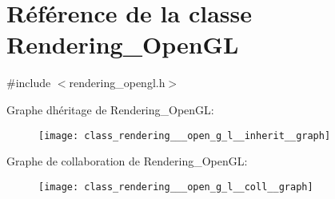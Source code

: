 \hypertarget{class_rendering___open_g_l}{}\section{Référence de la classe Rendering\+\_\+\+Open\+GL}
\label{class_rendering___open_g_l}


{\ttfamily \#include $<$rendering\+\_\+opengl.\+h$>$}



Graphe d\textquotesingle{}héritage de Rendering\+\_\+\+Open\+GL\+:\nopagebreak
\begin{figure}[H]
\begin{center}
\leavevmode
\texttt{[image: class\_rendering\_\_\_open\_g\_l\_\_inherit\_\_graph]}
\end{center}
\end{figure}


Graphe de collaboration de Rendering\+\_\+\+Open\+GL\+:\nopagebreak
\begin{figure}[H]
\begin{center}
\leavevmode
\texttt{[image: class\_rendering\_\_\_open\_g\_l\_\_coll\_\_graph]}
\end{center}
\end{figure}
